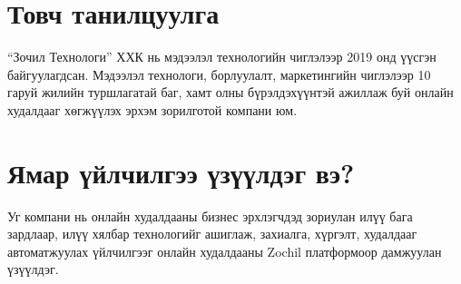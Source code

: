 \section{Товч танилцуулга}
“Зочил Технологи” ХХК нь мэдээлэл технологийн чиглэлээр 2019 онд үүсгэн байгуулагдсан. Мэдээлэл технологи, борлуулалт, маркетингийн чиглэлээр 10 гаруй жилийн туршлагатай баг, хамт олны бүрэлдэхүүнтэй ажиллаж буй онлайн худалдааг хөгжүүлэх эрхэм зорилготой компани юм.

\section{Ямар үйлчилгээ үзүүлдэг вэ?}
Уг компани нь онлайн худалдааны бизнес эрхлэгчдэд зориулан илүү бага зардлаар, илүү хялбар технологийг ашиглаж, захиалга, хүргэлт, худалдааг автоматжуулах үйлчилгээг онлайн худалдааны Zochil платформоор дамжуулан үзүүлдэг.

